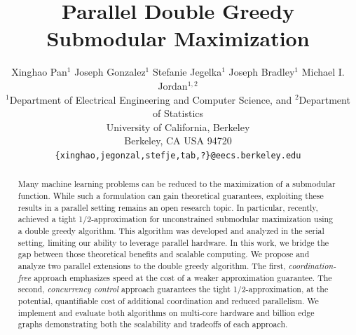 \documentclass{article} %
\title{Parallel Double Greedy Submodular Maximization}
\author{
Xinghao Pan$^1$ Joseph Gonzalez$^1$ Stefanie Jegelka$^1$ Joseph Bradley$^{1}$ Michael I. Jordan$^{1,2}$\\
$^1$Department of Electrical Engineering and Computer Science, and $^2$Department of Statistics\\
University of California, Berkeley\\
Berkeley, CA USA 94720\\
  \texttt{\{xinghao,jegonzal,stefje,tab,?\}@eecs.berkeley.edu} \\
}
\begin{document}
\maketitle


\begin{abstract}
Many machine learning problems can be reduced to the maximization of a submodular function. While such a formulation can gain theoretical guarantees, exploiting these results in a parallel setting remains an open research topic. In particular, recently, \citet{buchbinder2012} achieved a tight 1/2-approximation for unconstrained submodular maximization using a double greedy algorithm. This algorithm was developed and analyzed in the serial setting, limiting our ability to leverage parallel hardware. In this work, we bridge the gap between those theoretical benefits and scalable computing. We propose and analyze two parallel extensions to the double greedy algorithm.
The first, \emph{coordination-free} approach emphasizes speed at the cost of a weaker approximation guarantee.
The second, \emph{concurrency control} approach guarantees the tight 1/2-approximation, at the potential, quantifiable cost of additional coordination and reduced parallelism.
We implement and evaluate both algorithms on multi-core hardware and billion edge graphs demonstrating both the scalability and tradeoffs of each approach.
%
%


\end{abstract}
\end{document}

